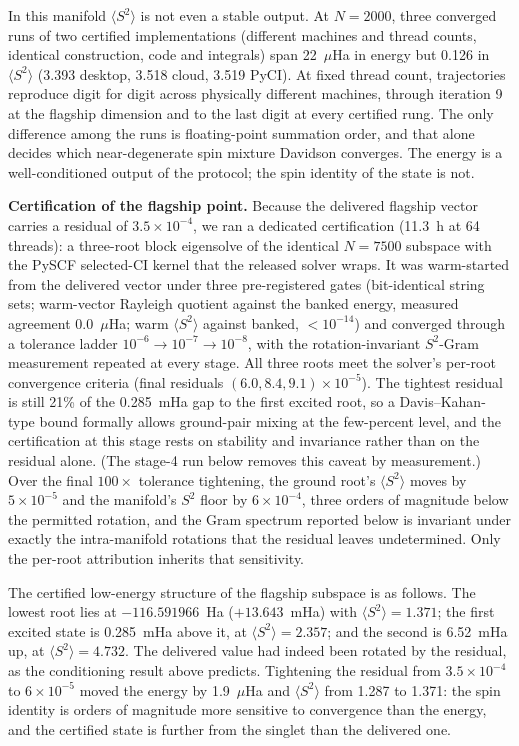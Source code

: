 \documentclass[11pt]{article}
\newcommand{\ssq}{\ensuremath{\langle S^2\rangle}}
\begin{document}
In this manifold \ssq{} is not even a stable output. At $N = 2000$, three converged runs of two certified implementations (different machines and thread counts, identical construction, code and integrals) span 22~$\mu$Ha in energy but 0.126 in \ssq{} (3.393 desktop, 3.518 cloud, 3.519 PyCI). At fixed thread count, trajectories reproduce digit for digit across physically different machines, through iteration 9 at the flagship dimension and to the last digit at every certified rung. The only difference among the runs is floating-point summation order, and that alone decides which near-degenerate spin mixture Davidson converges. The energy is a well-conditioned output of the protocol; the spin identity of the state is not.

\textbf{Certification of the flagship point.} Because the delivered flagship vector carries a residual of $3.5\times10^{-4}$, we ran a dedicated certification (11.3~h at 64 threads): a three-root block eigensolve of the identical $N = 7500$ subspace with the PySCF selected-CI kernel that the released solver wraps. It was warm-started from the delivered vector under three pre-registered gates (bit-identical string sets; warm-vector Rayleigh quotient against the banked energy, measured agreement 0.0~$\mu$Ha; warm \ssq{} against banked, $<10^{-14}$) and converged through a tolerance ladder $10^{-6} \to 10^{-7} \to 10^{-8}$, with the rotation-invariant $S^2$-Gram measurement repeated at every stage. All three roots meet the solver's per-root convergence criteria (final residuals $(6.0, 8.4, 9.1)\times10^{-5}$). The tightest residual is still 21\% of the 0.285~mHa gap to the first excited root, so a Davis--Kahan-type bound formally allows ground-pair mixing at the few-percent level, and the certification at this stage rests on stability and invariance rather than on the residual alone. (The stage-4 run below removes this caveat by measurement.) Over the final $100\times$ tolerance tightening, the ground root's \ssq{} moves by $5\times10^{-5}$ and the manifold's $S^2$ floor by $6\times10^{-4}$, three orders of magnitude below the permitted rotation, and the Gram spectrum reported below is invariant under exactly the intra-manifold rotations that the residual leaves undetermined. Only the per-root attribution inherits that sensitivity.

The certified low-energy structure of the flagship subspace is as follows. The lowest root lies at $-116.591966$~Ha ($+13.643$~mHa) with $\ssq = 1.371$; the first excited state is 0.285~mHa above it, at $\ssq = 2.357$; and the second is 6.52~mHa up, at $\ssq = 4.732$. The delivered value had indeed been rotated by the residual, as the conditioning result above predicts. Tightening the residual from $3.5\times10^{-4}$ to $6\times10^{-5}$ moved the energy by 1.9~$\mu$Ha and \ssq{} from 1.287 to 1.371: the spin identity is orders of magnitude more sensitive to convergence than the energy, and the certified state is further from the singlet than the delivered one.
\end{document}
